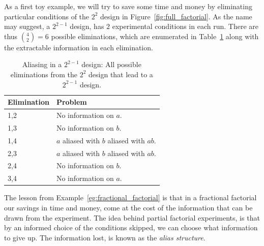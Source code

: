 \begin{example}[From $2^2$ to $2^{2-1}$]
\label{eg:fractional_factorial}
As a first toy example, we will try to save some time and money by eliminating particular conditions of the $2^2$ design in Figure~\ref{fig:full_factorial}.
As the name may suggest, a $2^{2-1}$ design, has $2$ experimental conditions in each run. 
There are thus $\binom{4}{2}=6$ possible eliminations, which are enumerated in Table~\ref{tab:partial_factorial} along with the extractable information in each elimination.
\begin{table}[ht]
\begin{tabular}{|p{2.5cm}|p{10cm}|}
\hline Elimination &  Problem \\ 
\hline
\hline 1,2 &  No information on $a$. \\ 
\hline 1,3 &  No information on $b$.\\ 
\hline 1,4 &  $a$ aliased with $b$ aliased with $ab$. \\ 
\hline 2,3 &  $a$ aliased with $b$ aliased with $ab$. \\ 
\hline 2,4 &  No information on $b$. \\ 
\hline 3,4 &  No information on $a$.\\ 
\hline 
\end{tabular} 
\caption[Aliasing]{Aliasing in a $2^{2-1}$ design: All possible eliminations from the $2^2$ design that lead to a $2^{2-1}$ design.}
\label{tab:partial_factorial}
\end{table}
\end{example}

The lesson from Example~\ref{eg:fractional_factorial} is that in a fractional factorial our savings in time and money, come at the cost of the information that can be drawn from the experiment.
The idea behind partial factorial experiments, is that by an informed choice of the conditions skipped, we can choose what information to give up. The information lost, is known as the \emph{alias structure}.

